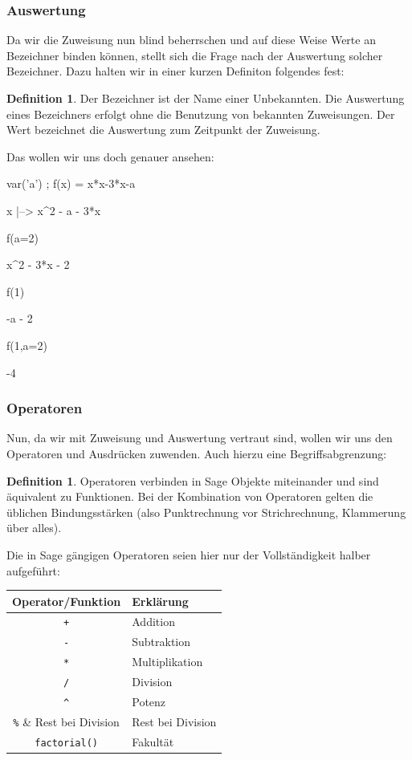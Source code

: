 \documentclass[fontsize=12pt,paper=a4,twoside,bibtotoc,idxtotoc,
liststotoc,pagesize,BCOR1.2cm,DIV15,chapterprefix,pagesize=pdftex]{scrbook}
\theoremstyle{plain}
\theoremstyle{definition}
\newtheorem{df}[equation]{Definition}
\theoremstyle{remark}
\begin{document}
\subsubsection{Auswertung}
Da wir die Zuweisung nun blind beherrschen und auf diese Weise Werte an Bezeichner binden können, stellt sich die Frage nach der Auswertung solcher 
Bezeichner. Dazu halten wir in einer kurzen Definiton folgendes fest:
\begin{df}
 Der Bezeichner ist der Name einer Unbekannten. Die Auswertung eines Bezeichners erfolgt ohne die Benutzung von bekannten Zuweisungen. Der Wert 
bezeichnet die Auswertung zum Zeitpunkt der Zuweisung.
\end{df}
Das wollen wir uns doch genauer ansehen:
    \begin{sagein}
    var('a') ; f(x) = x*x-3*x-a
    \end{sagein}
    \begin{sage}
    x |--> x^2 - a - 3*x
    \end{sage}
    \begin{sagein}
    f(a=2)
    \end{sagein}
    \begin{sage}
    x^2 - 3*x - 2 
    \end{sage}
    \begin{sagein}
    f(1)
    \end{sagein}
    \begin{sage}
      -a - 2
    \end{sage}
    \begin{sagein}
    f(1,a=2)
    \end{sagein}
    \begin{sage}
      -4
    \end{sage}
\subsubsection{Operatoren}
Nun, da wir mit Zuweisung und Auswertung vertraut sind, wollen wir uns den Operatoren und Ausdrücken zuwenden. Auch hierzu eine Begriffsabgrenzung:
\begin{df}
 Operatoren verbinden in Sage Objekte miteinander und sind äquivalent zu Funktionen. Bei der Kombination von Operatoren gelten die üblichen 
Bindungsstärken (also Punktrechnung vor Strichrechnung, Klammerung über alles).
\end{df}
Die in Sage gängigen Operatoren seien hier nur der Vollständigkeit halber aufgeführt:
\begin{center}
\begin{tabular}{|c|l|}
\hline
Operator/Funktion &  Erklärung\\
\hline
\hline
\verb!+! & Addition \\
\verb!-! & Subtraktion\\
\verb!*! & Multiplikation \\
\verb!/! & Division\\
\verb!^! & Potenz\\
\verb!%! &  Rest bei Division\\
\verb!factorial()! & Fakultät \\
\hline
\end{tabular}
\end{center}
\end{document}
